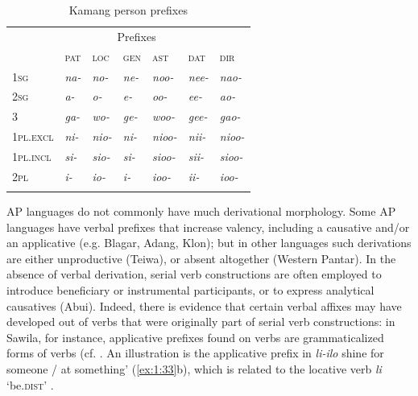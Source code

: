  

\begin{table}
\begin{tabularx}{.75\textwidth}{Xlllllll}
\lsptoprule
\multicolumn{1}{l}{} & \multicolumn{6}{c}{ Prefixes}  \\
& \multicolumn{2}{l}{{\scshape pat}} & {\scshape loc} & {\scshape gen} & \textsc{ast}\footnotemark{} & {\scshape dat} & {\scshape dir}\\
\midrule 
{\scshape 1sg} & \multicolumn{2}{l}{{\itshape na-}
} & {\itshape no-} & {\itshape ne-} & {\itshape noo-} & {\itshape nee-} &{\itshape nao-}\\
{\scshape 2sg} & \multicolumn{2}{l}{{\itshape a-}
} & {\itshape o-} & {\itshape e-} & {\itshape oo-} & {\itshape ee-}&{\itshape ao-}\\
3 & \multicolumn{2}{l}{{\itshape ga-}

} & {\itshape wo-} & {\itshape ge-} & {\itshape woo-} & {\itshape gee-}&{\itshape gao- }\\
\midrule
{\scshape 1pl.excl} & \multicolumn{2}{l}{{\itshape ni-}

} & {\itshape nio-} & {\itshape ni-} & {\itshape nioo-} & {\itshape nii-}&{\itshape nioo-}\\
{\scshape 1pl.incl} & \multicolumn{2}{l}{{\itshape si-}

} & {\itshape sio-} & {\itshape si-} & {\itshape sioo-} & {\itshape sii-}&{\itshape sioo-}\\
{\scshape 2pl} & \multicolumn{2}{l}{{\itshape i-}

} & {\itshape io-} & {\itshape i-} & {\itshape ioo-} & {\itshape ii-}&{\itshape ioo-}\\
\lspbottomrule
\end{tabularx}

\caption{ Kamang person prefixes \citep[322]{Schapperta}}
\label{tab:1:9}
\end{table}

AP languages do not commonly have much derivational morphology. Some AP languages have verbal prefixes that increase valency, including a causative and/or an applicative (e.g. Blagar, Adang, Klon); but in other languages such derivations are either unproductive (Teiwa), or absent altogether (Western Pantar). In the absence of verbal derivation, serial verb constructions are often employed to introduce beneficiary or instrumental participants, or to express analytical causatives (Abui). Indeed, there is evidence that certain verbal affixes may have developed out of verbs that were originally part of serial verb constructions: in Sawila, for instance, applicative prefixes found on verbs are grammaticalized forms of verbs (cf. \citealt{KlamertoappearTypology}. An illustration is the applicative prefix   in \textit{li-ilo} shine for someone / at something' (\ref{ex:1:33}b), which is related to the locative verb \textit{li} `be.\textsc{dist}' \citep{Kratochvilta}. 


